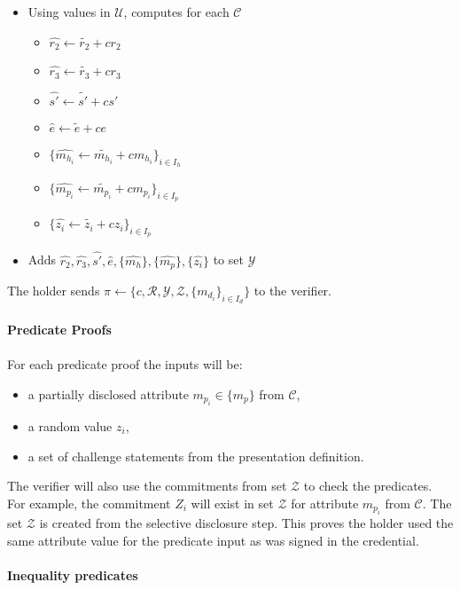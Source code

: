\documentclass[a4paper]{article}
\begin{document}
\begin{itemize}
\begin{itemize}
    \end{itemize}
    \item Using values in $\mathcal{U}$, computes for each $\mathcal{C}$
    \begin{itemize}
        \item $\widehat{r_2} \leftarrow \widetilde{r_2} + c r_2$
        \item $\widehat{r_3} \leftarrow \widetilde{r_3} + c r_3$
        \item $\widehat{s'} \leftarrow \widetilde{s'} + c s'$
        \item $\widehat{e} \leftarrow \widetilde{e} + c e$
        \item $\{\widehat{m_{h_i}} \leftarrow \widetilde{m_{h_i}} + c m_{h_i}\}_{i \in I_h}$
        \item $\{\widehat{m_{p_i}} \leftarrow \widetilde{m_{p_i}} + c m_{p_i}\}_{i \in I_p}$
        \item $\{\widehat{z_i} \leftarrow \widetilde{z_i} + cz_i\}_{i \in I_p}$
        \end{itemize}
    \item Adds $\widehat{r_2},\widehat{r_3},\widehat{s'},\widehat{e},\{\widehat{m_h}\},\{\widehat{m_p}\},\{\widehat{z_i}\}$ to set $\mathcal{Y}$
\end{itemize}
The holder sends $\pi \leftarrow \{c, \mathcal{R}, \mathcal{Y}, \mathcal{Z}, \{m_{d_i}\}_{i \in I_d}\}$ to the verifier.\\\\
\textbf{Predicate Proofs}\\\\
For each predicate proof the inputs will be:
\begin{itemize}
    \item a partially disclosed attribute $m_{p_i} \in \{m_p\}$ from $\mathcal{C}$,
    \item a random value $z_i$,
    \item a set of challenge statements from the presentation definition.
\end{itemize}
The verifier will also use the commitments from set $\mathcal{Z}$ to check the predicates. For example, the commitment $Z_i$ will exist in set $\mathcal{Z}$ for attribute $m_{p_i}$ from $\mathcal{C}$. The set $\mathcal{Z}$ is created from the selective disclosure step. This proves the holder used the same attribute value for the predicate input as was signed in the credential.\\\\
\textbf{Inequality predicates}\\\\
\end{document}
